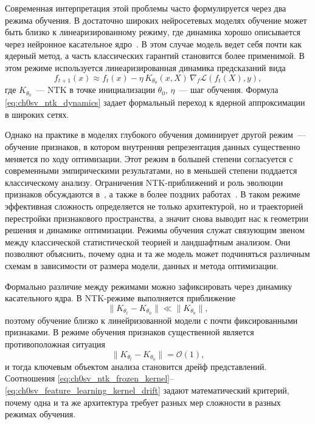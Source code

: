 Современная интерпретация этой проблемы часто формулируется через два режима обучения.
В достаточно широких нейросетевых моделях обучение может быть близко к линеаризированному режиму, где динамика хорошо описывается через нейронное касательное ядро~\cite{jacot2018neural,adlam2020ntkhighdim,uniform2021ntk}.
В этом случае модель ведет себя почти как ядерный метод, а часть классических гарантий становится более применимой.
В этом режиме используется линеаризированная динамика предсказаний вида
\begin{equation}
f_{t+1}(x)\approx f_t(x)-\eta\,K_{\theta_0}(x,X)\,\nabla_f\mathcal L\!\left(f_t(X),y\right),
\label{eq:ch0sv_ntk_dynamics}
\end{equation}
где $K_{\theta_0}$~--- NTK в точке инициализации $\theta_0$, $\eta$~--- шаг обучения.
Формула \eqref{eq:ch0sv_ntk_dynamics} задает формальный переход к ядерной аппроксимации в широких сетях.

Однако на практике в моделях глубокого обучения доминирует другой режим~--- обучение признаков, в котором внутренняя репрезентация данных существенно меняется по ходу оптимизации.
Этот режим в большей степени согласуется с современными эмпирическими результатами, но в меньшей степени поддается классическому анализу. Ограничения NTK-приближений и роль эволюции признаков обсуждаются в~\cite{arora2019finegrained,featurevskernel2020}, а также в более поздних работах~\cite{leaveoneout2022,seleznova2022ntklimits}.
В таком режиме эффективная сложность определяется не только архитектурой, но и траекторией перестройки признакового пространства, а значит снова выводит нас к геометрии решения и динамике оптимизации.
Режимы обучения служат связующим звеном между классической статистической теорией и ландшафтным анализом.
Они позволяют объяснить, почему одна и та же модель может подчиняться различным схемам в зависимости от размера модели, данных и метода оптимизации.

Формально различие между режимами можно зафиксировать через динамику касательного ядра. В NTK-режиме выполняется приближение
\begin{equation}
\|K_{\theta_t}-K_{\theta_0}\| \ll \|K_{\theta_0}\|,
\label{eq:ch0sv_ntk_frozen_kernel}
\end{equation}
поэтому обучение близко к линейризованной модели с почти фиксированными признаками. В режиме обучения признаков существенной является противоположная ситуация
\begin{equation}
\|K_{\theta_t}-K_{\theta_0}\| = \mathcal O(1),
\label{eq:ch0sv_feature_learning_kernel_drift}
\end{equation}
и тогда ключевым объектом анализа становится дрейф представлений. Соотношения \eqref{eq:ch0sv_ntk_frozen_kernel}--\eqref{eq:ch0sv_feature_learning_kernel_drift} задают математический критерий, почему одна и та же архитектура требует разных мер сложности в разных режимах обучения.

